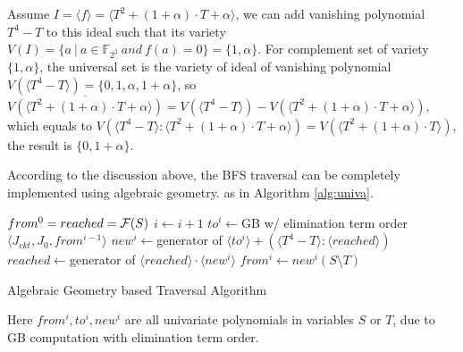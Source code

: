 Assume $I = \langle f\rangle  = \langle T^2 +
(1+\alpha)\cdot T+\alpha\rangle $,  we can add vanishing polynomial
$T^4 - T$ to this ideal such that its variety  $V(I) = \{a\ |\ a \in
\mathbb{F}_{2^2}\ and\ f(a) = 0\} = \{1, \alpha\}$. For complement set
of variety $\{1, \alpha\}$, the universal set is the variety of ideal
of vanishing polynomial $V(\langle T^4-T\rangle ) =
\{0,1,\alpha,1+\alpha\}$, 
so $\overline{V(\langle T^2 + (1+\alpha)\cdot T+\alpha\rangle )} = V(\langle T^4-T\rangle ) - V(\langle T^2 + (1+\alpha)\cdot T+\alpha\rangle )$,
which equals to $V(\langle T^4-T\rangle :\langle T^2 + (1+\alpha)\cdot T+\alpha\rangle ) = V(\langle T^2+(1+\alpha)\cdot T\rangle )$,
the result is $\{0,1+\alpha\}$.

According to the discussion above, the BFS traversal can be completely implemented using algebraic geometry.
as in Algorithm \ref{alg:univa}.

\begin{algorithm}[hbt]
\SetAlgoNoLine

  $from^0 = reached = {\mathcal{F}}(S)$\;
  {
  	$i \gets i + 1$\;
	$to^i \gets$GB w/ elimination term order$\langle J_{ckt},J_0, from^{i-1}\rangle$\;
	$new^i \gets $generator of $\langle to^i\rangle + (\langle T^4-T\rangle:\langle reached\rangle)$\;
  	$reached \gets $generator of $\langle reached\rangle \cdot \langle new^i\rangle$\;
	$from^i \gets new^i(S\setminus T)$\;
  }
\caption {Algebraic Geometry based Traversal Algorithm}\label{alg:univa}
\end{algorithm}

Here $from^i, to^i, new^i$ are all univariate polynomials in variables $S$ or $T$, due to GB computation
with elimination term order.


